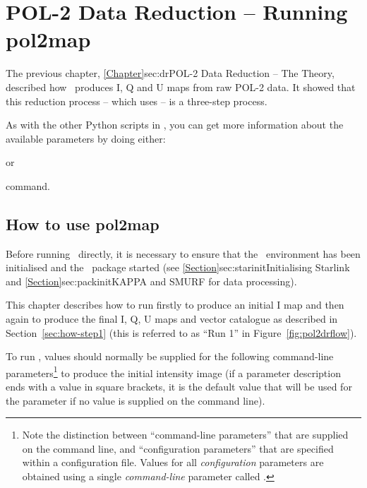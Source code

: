 \chapter{POL-2 Data Reduction -- Running
  pol2map}
\label{sec:rundr}

The previous chapter, \cref{Chapter}{sec:dr}{POL-2 Data Reduction --
  The Theory}, described how \poltwomap\ produces I, Q and U maps from raw
POL-2 data.  It showed that this reduction process -- which uses
 -- is a three-step process.

As with the other Python scripts in \SMURF, you can get more
information about the available parameters by doing either:
\begin{terminalv}
\end{terminalv}
or
\begin{terminalv}
\end{terminalv}
command.

\section{How to use pol2map}

Before running \poltwomap\ directly, it is necessary to ensure that
the \starlink\ environment has been initialised and the \smurf\
package started (see \cref{Section}{sec:starinit}{Initialising
  Starlink} and \cref{Section}{sec:packinit}{KAPPA and SMURF for data
  processing}).

This chapter describes how to run  firstly to produce an
initial I map and then again to produce the final I, Q, U maps and
vector catalogue as described in Section~\ref{sec:how-step1}
(this is referred to as ``Run 1'' in Figure~\ref{fig:pol2drflow}).

To run , values should normally be supplied for the following
command-line parameters\footnote{Note the distinction between
  ``command-line parameters'' that are supplied on the
   command line, and ``configuration parameters'' that
  are specified within a configuration file. Values for all
  \emph{configuration} parameters are obtained using a single
  \emph{command-line} parameter called .} to produce
the initial intensity image (if a parameter description ends with a value
in square brackets, it is the default value that will be used for
the parameter if no value is supplied on the command line).

